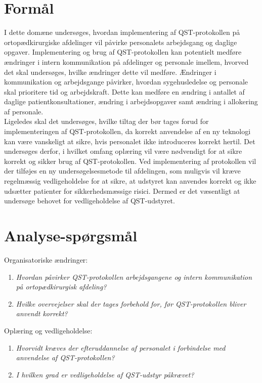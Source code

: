 \section{Formål}
I dette domæne undersøges, hvordan implementering af QST-protokollen på ortopædkirurgiske afdelinger vil påvirke personalets arbejdsgang og daglige opgaver. Implementering og brug af QST-protokollen kan potentielt medføre ændringer i intern kommunikation på afdelinger og personale imellem, hvorved det skal undersøges, hvilke ændringer dette vil medføre. Ændringer i kommunikation og arbejdsgange påvirker, hvordan sygehusledelse og personale skal prioritere tid og arbejdskraft. Dette kan medføre en ændring i antallet af daglige patientkonsultationer, ændring i arbejdsopgaver samt ændring i allokering af personale. \\
Ligeledes skal det undersøges, hvilke tiltag der bør tages forud for implementeringen af QST-protokollen, da korrekt anvendelse af en ny teknologi kan være vanskeligt at sikre, hvis personalet ikke introduceres korrekt hertil. Det undersøges derfor, i hvilket omfang oplæring vil være nødvendigt for at sikre korrekt og sikker brug af QST-protokollen. Ved implementering af protokollen vil der tilføjes en ny undersøgelsesmetode til afdelingen, som muligvis vil kræve regelmæssig vedligeholdelse for at sikre, at udstyret kan anvendes korrekt og ikke udsætter patienter for sikkerhedsmæssige risici. Dermed er det væsentligt at undersøge behovet for vedligeholdelse af QST-udstyret.

\section{Analyse-spørgsmål}
Organisatoriske ændringer:
\begin{enumerate}
	\item \textit{Hvordan påvirker QST-protokollen arbejdsgangene og intern kommunikation på ortopædkirurgisk afdeling?} %
	\item \textit{Hvilke overvejelser skal der tages forbehold for, før QST-protokollen bliver anvendt korrekt?} %
\end{enumerate}
Oplæring og vedligeholdelse:
\begin{enumerate}[resume]
	\item \textit{Hvorvidt kræves der efteruddannelse af personalet i forbindelse med anvendelse af QST-protokollen?} %
	\item \textit{I hvilken grad er vedligeholdelse af QST-udstyr påkrævet?} %
\end{enumerate}

